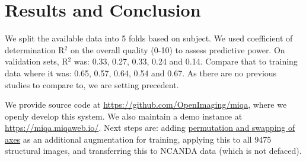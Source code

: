 \documentclass{midl} %
\begin{document}
\section{Results and Conclusion}

We split the available data into 5 folds based on subject. We used coefficient of determination R$^2$ on the overall quality (0-10) to assess predictive power. On validation sets, R$^2$ was: 0.33, 0.27, 0.33, 0.24 and 0.14. Compare that to training data where it was: 0.65, 0.57, 0.64, 0.54 and 0.67. As there are no previous studies to compare to, we are setting precedent.

We provide source code at \url{https://github.com/OpenImaging/miqa}, where we openly develop this system. We also maintain a demo instance at \url{https://miqa.miqaweb.io/}. Next steps are: adding \href{https://github.com/OpenImaging/miqa/pull/441}{permutation and swapping of axes} as an additional augmentation for training, applying this to all 9475 structural images, and transferring this to NCANDA data (which is not defaced).




\end{document}
